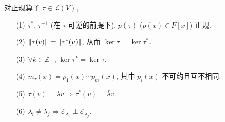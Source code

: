 \documentclass{note}
\begin{document}
\begin{thm}
    对正规算子 $\tau\in\mathcal{L}(V)$,
    \begin{itemize}
        \item[(1)] $\tau^*$, $\tau^{-1}$ (在 $\tau$ 可逆的前提下), $p(\tau)$ ($p(x)\in F[x]$) 正规.
        \item[(2)] $\left\lVert\tau(v)\right\rVert=\left\lVert\tau^*(v)\right\rVert$, 从而 $\ker\tau=\ker\tau^*$.
        \item[(3)] $\forall k\in\mathbb{Z}^+$, $\ker\tau^k=\ker\tau$.
        \item[(4)] $m_{\tau}(x)=p_1(x)\cdots p_m(x)$, 其中 $p_i(x)$ 不可约且互不相同.
        \item[(5)] $\tau(v)=\lambda v\Longrightarrow\tau^*(v)=\bar{\lambda}v$.
        \item[(6)] $\lambda_i\neq\lambda_j\Longrightarrow\mathcal{E}_{\lambda_i}\perp\mathcal{E}_{\lambda_j}$.
    \end{itemize}
\end{thm}
\end{document}
